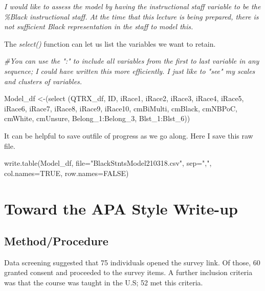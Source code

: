 \documentclass[
  11pt,
]{book}
\newenvironment{Shaded}{\begin{snugshade}}{\end{snugshade}}
\newcommand{\AttributeTok}[1]{\textcolor[rgb]{0.77,0.63,0.00}{#1}}
\newcommand{\CommentTok}[1]{\textcolor[rgb]{0.56,0.35,0.01}{\textit{#1}}}
\newcommand{\ConstantTok}[1]{\textcolor[rgb]{0.00,0.00,0.00}{#1}}
\newcommand{\FunctionTok}[1]{\textcolor[rgb]{0.00,0.00,0.00}{#1}}
\newcommand{\NormalTok}[1]{#1}
\newcommand{\OtherTok}[1]{\textcolor[rgb]{0.56,0.35,0.01}{#1}}
\newcommand{\SpecialCharTok}[1]{\textcolor[rgb]{0.00,0.00,0.00}{#1}}
\newcommand{\StringTok}[1]{\textcolor[rgb]{0.31,0.60,0.02}{#1}}
\begin{document}
\emph{I would like to assess the model by having the instructional staff variable to be the \%Black instructional staff. At the time that this lecture is being prepared, there is not sufficient Black representation in the staff to model this.}

The \emph{select()} function can let us list the variables we want to retain.

\begin{Shaded}
\begin{Highlighting}[]
\CommentTok{\#You can use the ":" to include all variables from the first to last variable in any sequence; I could have written this more efficiently.  I just like to "see" my scales and clusters of variables.}

\NormalTok{Model\_df }\OtherTok{\textless{}{-}}\NormalTok{(}\FunctionTok{select}\NormalTok{ (QTRX\_df, ID, iRace1, iRace2, iRace3, iRace4, iRace5, iRace6, iRace7, iRace8, iRace9, iRace10, cmBiMulti, cmBlack, cmNBPoC, cmWhite, cmUnsure, Belong\_1}\SpecialCharTok{:}\NormalTok{Belong\_3, Blst\_1}\SpecialCharTok{:}\NormalTok{Blst\_6))}
\end{Highlighting}
\end{Shaded}

It can be helpful to save outfile of progress as we go along. Here I save this raw file.

\begin{Shaded}
\begin{Highlighting}[]
\FunctionTok{write.table}\NormalTok{(Model\_df, }\AttributeTok{file=}\StringTok{"BlackStntsModel210318.csv"}\NormalTok{, }\AttributeTok{sep=}\StringTok{","}\NormalTok{, }\AttributeTok{col.names=}\ConstantTok{TRUE}\NormalTok{, }\AttributeTok{row.names=}\ConstantTok{FALSE}\NormalTok{)}
\end{Highlighting}
\end{Shaded}

\hypertarget{toward-the-apa-style-write-up}{%
\section{Toward the APA Style Write-up}\label{toward-the-apa-style-write-up}}

\hypertarget{methodprocedure}{%
\subsection{Method/Procedure}\label{methodprocedure}}

Data screening suggested that 75 individuals opened the survey link. Of those, 60 granted consent and proceeded to the survey items. A further inclusion criteria was that the course was taught in the U.S; 52 met this criteria.
\end{document}
